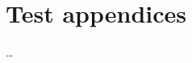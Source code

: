 \appendix
\chapter{Test appendices}
	\ldots

\listoffigures
\begingroup
\let\clearpage\relax
\listoftables
\endgroup
\begingroup
\let\clearpage\relax
\listofalgorithms
\endgroup

\newpage